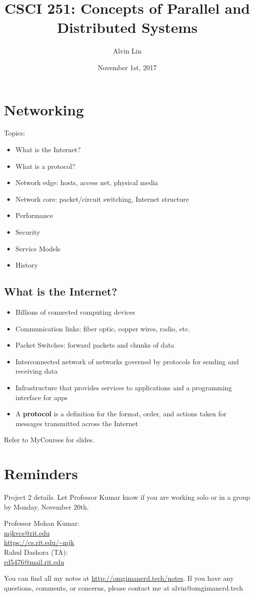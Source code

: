 \documentclass{math}
\title{CSCI 251: Concepts of Parallel and Distributed Systems}
\author{Alvin Lin}
\date{November 1st, 2017}
\begin{document}
\maketitle

\section*{Networking}
Topics:
\begin{itemize}
  \item What is the Internet?
  \item What is a protocol?
  \item Network edge: hosts, access net, physical media
  \item Network core: packet/circuit switching, Internet structure
  \item Performance
  \item Security
  \item Service Models
  \item History
\end{itemize}

\subsection*{What is the Internet?}
\begin{itemize}
  \item Billions of connected computing devices
  \item Communication links: fiber optic, copper wires, radio, etc.
  \item Packet Switches: forward packets and chunks of data
  \item Interconnected network of networks governed by protocols for sending
  and receiving data
  \item Infrastructure that provides services to applications and a programming
  interface for apps
  \item A \textbf{protocol} is a definition for the format, order, and actions
  taken for messages transmitted across the Internet
\end{itemize}
Refer to MyCourses for slides.

\section*{Reminders}
Project 2 details. Let Professor Kumar know if you are working solo or in a
group by Monday, November 20th.

\noindent Professor Mohan Kumar: \\
\url{mjkvcs@rit.edu} \\
\url{https://cs.rit.edu/~mjk} \\

\noindent Rahul Dashora (TA): \\
\url{rd5476@mail.rit.edu} \\

\begin{center}
  You can find all my notes at \url{http://omgimanerd.tech/notes}. If you have
  any questions, comments, or concerns, please contact me at
  alvin@omgimanerd.tech
\end{center}
\end{document}

